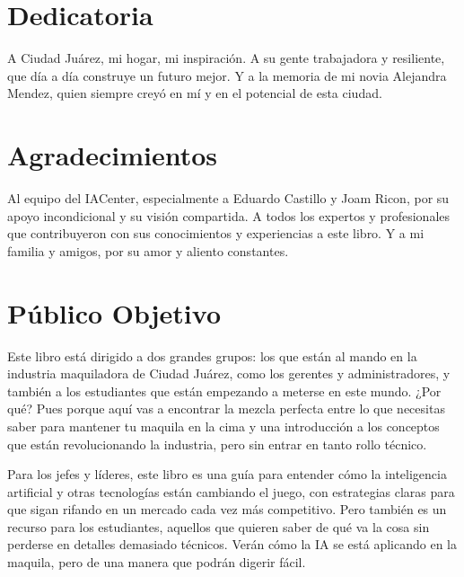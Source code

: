 \documentclass[
  letterpaper,
]{book}
\begin{document}
\section*{Dedicatoria}\label{dedicatoria}


A Ciudad Juárez, mi hogar, mi inspiración. A su gente trabajadora y
resiliente, que día a día construye un futuro mejor. Y a la memoria de
mi novia Alejandra Mendez, quien siempre creyó en mí y en el potencial
de esta ciudad.

\section*{Agradecimientos}\label{agradecimientos}


Al equipo del IACenter, especialmente a Eduardo Castillo y Joam Ricon,
por su apoyo incondicional y su visión compartida. A todos los expertos
y profesionales que contribuyeron con sus conocimientos y experiencias a
este libro. Y a mi familia y amigos, por su amor y aliento constantes.

\section*{Público Objetivo}\label{puxfablico-objetivo}


Este libro está dirigido a dos grandes grupos: los que están al mando en
la industria maquiladora de Ciudad Juárez, como los gerentes y
administradores, y también a los estudiantes que están empezando a
meterse en este mundo. ¿Por qué? Pues porque aquí vas a encontrar la
mezcla perfecta entre lo que necesitas saber para mantener tu maquila en
la cima y una introducción a los conceptos que están revolucionando la
industria, pero sin entrar en tanto rollo técnico.

Para los jefes y líderes, este libro es una guía para entender cómo la
inteligencia artificial y otras tecnologías están cambiando el juego,
con estrategias claras para que sigan rifando en un mercado cada vez más
competitivo. Pero también es un recurso para los estudiantes, aquellos
que quieren saber de qué va la cosa sin perderse en detalles demasiado
técnicos. Verán cómo la IA se está aplicando en la maquila, pero de una
manera que podrán digerir fácil.
\end{document}

